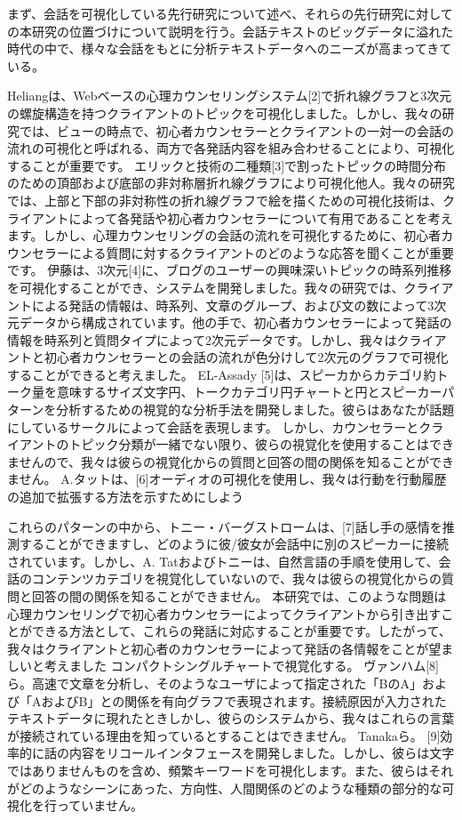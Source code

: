 \documentclass[shuuron]{kuee}
\begin{document}
まず、会話を可視化している先行研究について述べ、それらの先行研究に対しての本研究の位置づけについて説明を行う。会話テキストのビッグデータに溢れた時代の中で、様々な会話をもとに分析テキストデータへのニーズが高まってきている。

Heliangは、Webベースの心理カウンセリングシステム[2]で折れ線グラフと3次元の螺旋構造を持つクライアントのトピックを可視化しました。しかし、我々の研究では、ビューの時点で、初心者カウンセラーとクライアントの一対一の会話の流れの可視化と呼ばれる、両方で各発話内容を組み合わせることにより、可視化することが重要です。
  エリックと技術の二種類[3]で割ったトピックの時間分布のための頂部および底部の非対称層折れ線グラフにより可視化他人。我々の研究では、上部と下部の非対称性の折れ線グラフで絵を描くための可視化技術は、クライアントによって各発話や初心者カウンセラーについて有用であることを考えます。しかし、心理カウンセリングの会話の流れを可視化するために、初心者カウンセラーによる質問に対するクライアントのどのような応答を聞くことが重要です。
  伊藤は、3次元[4]に、ブログのユーザーの興味深いトピックの時系列推移を可視化することができ、システムを開発しました。我々の研究では、クライアントによる発話の情報は、時系列、文章のグループ、および文の数によって3次元データから構成されています。他の手で、初心者カウンセラーによって発話の情報を時系列と質問タイプによって2次元データです。しかし、我々はクライアントと初心者カウンセラーとの会話の流れが色分けして2次元のグラフで可視化することができると考えました。
   EL-Assady [5]は、スピーカからカテゴリ約トーク量を意味するサイズ文字円、トークカテゴリ円チャートと円とスピーカーパターンを分析するための視覚的な分析手法を開発しました。彼らはあなたが話題にしているサークルによって会話を表現します。
しかし、カウンセラーとクライアントのトピック分類が一緒でない限り、彼らの視覚化を使用することはできませんので、我々は彼らの視覚化からの質問と回答の間の関係を知ることができません。
  A.タットは、[6]オーディオの可視化を使用し、我々は行動を行動履歴の追加で拡張する方法を示すためにしよう

 これらのパターンの中から、トニー・バーグストロームは、[7]話し手の感情を推測することができますし、どのように彼/彼女が会話中に別のスピーカーに接続されています。しかし、A. Tatおよびトニーは、自然言語の手順を使用して、会話のコンテンツカテゴリを視覚化していないので、我々は彼らの視覚化からの質問と回答の間の関係を知ることができません。
  本研究では、このような問題は心理カウンセリングで初心者カウンセラーによってクライアントから引き出すことができる方法として、これらの発話に対応することが重要です。したがって、我々はクライアントと初心者のカウンセラーによって発話の各情報をことが望ましいと考えました コンパクトシングルチャートで視覚化する。
  ヴァンハム[8]ら。高速で文章を分析し、そのようなユーザによって指定された「BのA」および「AおよびB」との関係を有向グラフで表現されます。接続原因が入力されたテキストデータに現れたときしかし、彼らのシステムから、我々はこれらの言葉が接続されている理由を知っているとすることはできません。
  Tanakaら。 [9]効率的に話の内容をリコールインタフェースを開発しました。しかし、彼らは文字ではありませんものを含め、頻繁キーワードを可視化します。また、彼らはそれがどのようなシーンにあった、方向性、人間関係のどのような種類の部分的な可視化を行っていません。
\end{document}
